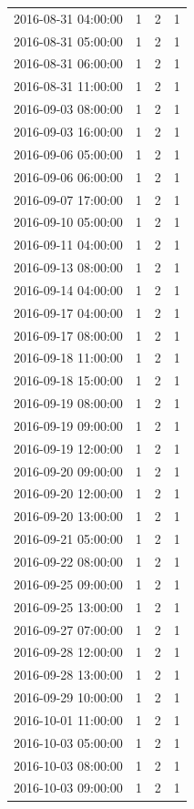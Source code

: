 \begin{tabular}{lrrr}
2016-08-31 04:00:00 & 1 & 2 & 1 \\
2016-08-31 05:00:00 & 1 & 2 & 1 \\
2016-08-31 06:00:00 & 1 & 2 & 1 \\
2016-08-31 11:00:00 & 1 & 2 & 1 \\
2016-09-03 08:00:00 & 1 & 2 & 1 \\
2016-09-03 16:00:00 & 1 & 2 & 1 \\
2016-09-06 05:00:00 & 1 & 2 & 1 \\
2016-09-06 06:00:00 & 1 & 2 & 1 \\
2016-09-07 17:00:00 & 1 & 2 & 1 \\
2016-09-10 05:00:00 & 1 & 2 & 1 \\
2016-09-11 04:00:00 & 1 & 2 & 1 \\
2016-09-13 08:00:00 & 1 & 2 & 1 \\
2016-09-14 04:00:00 & 1 & 2 & 1 \\
2016-09-17 04:00:00 & 1 & 2 & 1 \\
2016-09-17 08:00:00 & 1 & 2 & 1 \\
2016-09-18 11:00:00 & 1 & 2 & 1 \\
2016-09-18 15:00:00 & 1 & 2 & 1 \\
2016-09-19 08:00:00 & 1 & 2 & 1 \\
2016-09-19 09:00:00 & 1 & 2 & 1 \\
2016-09-19 12:00:00 & 1 & 2 & 1 \\
2016-09-20 09:00:00 & 1 & 2 & 1 \\
2016-09-20 12:00:00 & 1 & 2 & 1 \\
2016-09-20 13:00:00 & 1 & 2 & 1 \\
2016-09-21 05:00:00 & 1 & 2 & 1 \\
2016-09-22 08:00:00 & 1 & 2 & 1 \\
2016-09-25 09:00:00 & 1 & 2 & 1 \\
2016-09-25 13:00:00 & 1 & 2 & 1 \\
2016-09-27 07:00:00 & 1 & 2 & 1 \\
2016-09-28 12:00:00 & 1 & 2 & 1 \\
2016-09-28 13:00:00 & 1 & 2 & 1 \\
2016-09-29 10:00:00 & 1 & 2 & 1 \\
2016-10-01 11:00:00 & 1 & 2 & 1 \\
2016-10-03 05:00:00 & 1 & 2 & 1 \\
2016-10-03 08:00:00 & 1 & 2 & 1 \\
2016-10-03 09:00:00 & 1 & 2 & 1 \\

\end{tabular}
